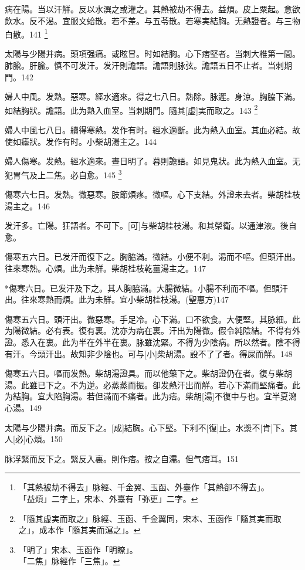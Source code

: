 \documentclass[12pt,oneside,UTF8,b5paper]{ctexbook}她她她她她她她
\begin{document}
病在陽。当以汗觧。反以水潠之或灌之。其熱被劫不得去。益煩。皮上粟起。意欲飲水。反不渴。宜服文蛤散。若不差。与五苓散。若寒実結胸。无熱證者。与三物白散。141
	\footnote{「其熱被劫不得去」脉經、千金翼、玉函、外臺作「其熱卻不得去」。\\「益煩」二字上，宋本、外臺有「弥更」二字。}

太陽与少陽并病。頭項强痛。或眩冒。时如結胸。心下痞堅者。当刺大椎第一間。肺腧。肝腧。慎不可发汗。发汗則譫語。譫語則脉弦。譫語五日不止者。当刺期門。142

婦人中風。发熱。惡寒。經水適來。得之七八日。熱除。脉遲。身涼。胸脇下滿。如結胸狀。譫語。此为熱入血室。当刺期門。隨其[虚]実而取之。143
	\footnote{「隨其虚実而取之」脉經、玉函、千金翼同，宋本、玉函作「隨其実而取之」，成本作「隨其実而瀉之」。}

婦人中風七八日。續得寒熱。发作有时。經水適斷。此为熱入血室。其血必結。故使如瘧狀。发作有时。小柴胡湯主之。144

婦人傷寒。发熱。經水適來。晝日明了。暮則譫語。如見鬼狀。此为熱入血室。无犯胃气及上二焦。必自愈。145
	\footnote{「明了」宋本、玉函作「明瞭」。\\「二焦」脉經作「三焦」。}

傷寒六七日。发熱。微惡寒。肢節煩疼。微嘔。心下支結。外證未去者。柴胡桂枝湯主之。146

发汗多。亡陽。狂語者。不可下。[可]与柴胡桂枝湯。和其榮衛。以通津液。後自愈。

傷寒五六日。已发汗而復下之。胸脇滿。微結。小便不利。渴而不嘔。但頭汗出。往來寒熱。心煩。此为未觧。柴胡桂枝乾薑湯主之。147

*傷寒六日。已发汗及下之。其人胸脇滿。大腸微結。小腸不利而不嘔。但頭汗出。往來寒熱而煩。此为未觧。宜小柴胡桂枝湯。(聖惠方)147

傷寒五六日。頭汗出。微惡寒。手足冷。心下滿。口不欲食。大便堅。其脉細。此为陽微結。必有表。復有裏。沈亦为病在裏。汗出为陽微。假令純陰結。不得有外證。悉入在裏。此为半在外半在裏。脉雖沈緊。不得为少陰病。所以然者。陰不得有汗。今頭汗出。故知非少陰也。可与[小]柴胡湯。設不了了者。得屎而觧。148

傷寒五六日。嘔而发熱。柴胡湯證具。而以他藥下之。柴胡證仍在者。復与柴胡湯。此雖已下之。不为逆。必蒸蒸而振。卻发熱汗出而觧。若心下滿而堅痛者。此为結胸。宜大陷胸湯。若但滿而不痛者。此为痞。柴胡[湯]不復中与也。宜半夏瀉心湯。149

太陽与少陽并病。而反下之。[成]結胸。心下堅。下利不[復]止。水漿不[肯]下。其人[必]心煩。150

脉浮緊而反下之。緊反入裏。則作痞。按之自濡。但气痞耳。151
\end{document}
